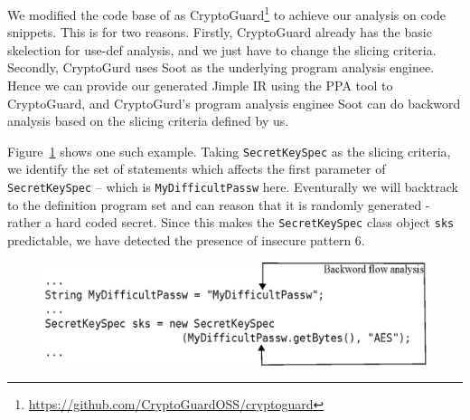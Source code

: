 
We modified the code base of  as CryptoGuard\footnote{\url{https://github.com/CryptoGuardOSS/cryptoguard}} to achieve our analysis on code snippets. 
This is for two reasons. Firstly, CryptoGuard already has the basic skelection for use-def analysis, and we just have to change the slicing criteria. 
Secondly, CryptoGurd uses Soot as the underlying program analysis enginee. 
Hence we can provide our generated Jimple IR using the PPA tool to CryptoGuard, and   
CryptoGurd's program analysis enginee Soot can do backword analysis based on the slicing criteria defined by us.

Figure~\ref{fig:slicing} shows one such example. Taking \texttt{SecretKeySpec} as the slicing criteria, 
we identify the set of statements which affects the first parameter of \texttt{SecretKeySpec} -- 
which is \texttt{MyDifficultPassw} here. Eventurally we will backtrack to the definition program set and can reason 
that it is randomly generated - rather a hard coded  secret. Since this makes the \texttt{SecretKeySpec} class object \texttt{sks} predictable,
 we have detected the presence of insecure pattern 6.

\begin{figure}[ht]
\includegraphics[width=\linewidth]{Figures/bckfwanalysis.eps}
\caption{}
\label{fig:slicing}
\end{figure}


